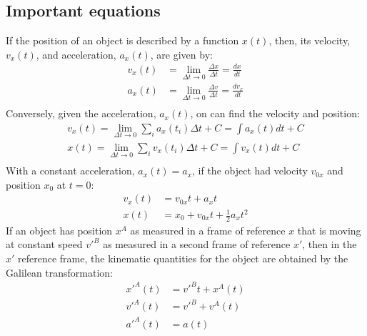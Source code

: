\subsection{Important equations}
If the position of an object is described by a function $x(t)$, then, its velocity, $v_x(t)$, and acceleration, $a_x(t)$, are given by:
\begin{align*}
v_x(t)&=\lim_{\Delta t\to 0}\frac{\Delta x}{\Delta t}=\frac{dx}{dt}\\
a_x(t)&=\lim_{\Delta t\to 0}\frac{\Delta v}{\Delta t}=\frac{dv_x}{dt}\\
\end{align*}
Conversely, given the acceleration, $a_x(t)$, on can find the velocity and position:
\begin{align*}
v_x(t)=\lim_{\Delta t\to 0}\sum_ia_x(t_i)\Delta t+C=\int a_x(t)dt+C\\
x(t)=\lim_{\Delta t\to 0}\sum_iv_x(t_i)\Delta t+C=\int v_x(t)dt+C\\
\end{align*}
With a constant acceleration, $a_x(t)=a_x$, if the object had velocity $v_{0x}$ and position $x_0$ at $t=0$:
\begin{align*}
v_x(t)&=v_{0x}t+a_xt\\
x(t)&=x_0+v_{0x}t+\frac{1}{2}a_xt^2
\end{align*}
If an object has position $x^A$ as measured in a frame of reference $x$ that is moving at constant speed $v'^B$ as measured in a second frame of reference $x'$, then in the $x'$ reference frame, the kinematic quantities for the object are obtained by the Galilean transformation:
\begin{align*}
x'^A(t) &= v'^Bt + x^A(t)\\
v'^A(t) &=v'^B+v^A(t)\\
a'^A(t) &= a(t)
\end{align*}
